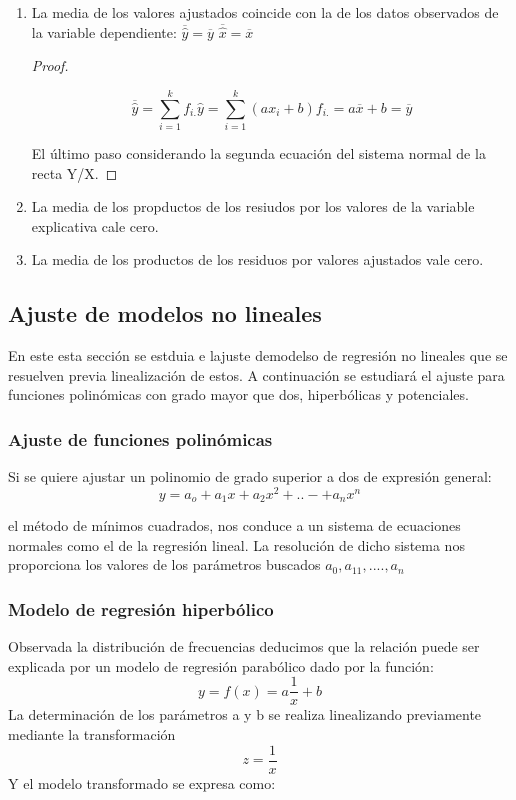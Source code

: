 \documentclass{article}
\begin{document}
\begin{enumerate}
\item La media de los valores ajustados coincide con la de los datos observados de la variable dependiente: $\overline{\hat{y}} = \overline{y} $ $\overline{\hat{x}} = \overline{x}$

\begin{proof}
$ $\newline

$$ \overline{\hat{y}} = \sum_{i=1}^kf_{i.} \hat{y}  = \sum_{i=1}^k(ax_i +b)f_{i.} = a\overline{x} +b = \overline{y} $$

El último paso considerando la segunda ecuación del sistema normal de la recta Y/X.
\end{proof}
\item La media de los propductos de los resiudos por los valores de la variable explicativa cale cero.
\item La media de los productos de los residuos por valores ajustados vale cero.

\end{enumerate}

\subsection{Ajuste de modelos no lineales}

En este esta sección se estduia e lajuste demodelso de regresión no lineales que se resuelven previa linealización de estos. A continuación se estudiará el ajuste para funciones polinómicas con grado mayor que dos, hiperbólicas y potenciales.

\subsubsection{Ajuste de funciones polinómicas}

Si se quiere ajustar un polinomio de grado superior a dos de expresión general:
$$ y = a_o + a_1x +a_2x^2 + ..- + a_nx^n $$

el método de mínimos cuadrados, nos conduce a un sistema de ecuaciones normales como el de la regresión lineal. La resolución de dicho sistema nos proporciona los valores de los parámetros buscados $a_0, a_11, .... , a_n$
\subsubsection{Modelo de regresión hiperbólico}

Observada la distribución de frecuencias deducimos que la relación puede ser explicada por un modelo de regresión parabólico dado por la función:
$$ y= f(x) = a\frac{1}{x} + b $$
La determinación de los parámetros a y b se realiza linealizando previamente mediante la transformación 
$$ z = \frac{1}{x} $$
Y el modelo transformado se expresa como:
\end{document}
